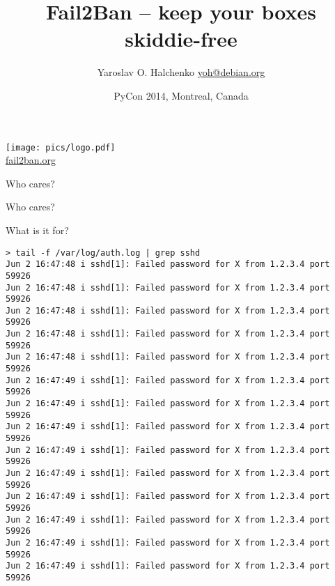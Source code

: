 \documentclass[]{beamer}
\title[Fail2Ban]{Fail2Ban -- keep your boxes skiddie-free}
\author[yoh AKA Yarik]{Yaroslav O. Halchenko
  \href{mailto: yoh@debian.org}{yoh@debian.org}}
\institute[Dartmouth, (Neuro)Debian]{\href{http://www.dartmouth.edu}{Dartmouth College},
\href{http://www.debian.org}{Debian Project}
}
\date[PyCon 2014]{PyCon 2014, Montreal, Canada}
\begin{document}
{%
 \NDPYMVPABG
 \frame{\titlepage}}

\begin{frame}{}
\begin{center}
\texttt{[image: pics/logo.pdf]}
\\
\href{http://fail2ban.org}{fail2ban.org}
\end{center}
\end{frame}

\begin{frame}{}
\begin{center}
\Large Who cares?
\end{center}
\end{frame}

\begin{frame}{Who cares?}
\begin{center}
\end{center}
\end{frame}



\begin{frame}[t,fragile]{What is it for?}
\begin{Verbatim}[commandchars=\\\{\},fontsize=\scriptsize]
> tail -f /var/log/auth.log | grep sshd
Jun 2 16:47:48 i sshd[1]: Failed password for X from 1.2.3.4 port 59926
Jun 2 16:47:48 i sshd[1]: Failed password for X from 1.2.3.4 port 59926
Jun 2 16:47:48 i sshd[1]: Failed password for X from 1.2.3.4 port 59926
Jun 2 16:47:48 i sshd[1]: Failed password for X from 1.2.3.4 port 59926
Jun 2 16:47:48 i sshd[1]: Failed password for X from 1.2.3.4 port 59926
Jun 2 16:47:49 i sshd[1]: Failed password for X from 1.2.3.4 port 59926
Jun 2 16:47:49 i sshd[1]: Failed password for X from 1.2.3.4 port 59926
Jun 2 16:47:49 i sshd[1]: Failed password for X from 1.2.3.4 port 59926
Jun 2 16:47:49 i sshd[1]: Failed password for X from 1.2.3.4 port 59926
Jun 2 16:47:49 i sshd[1]: Failed password for X from 1.2.3.4 port 59926
Jun 2 16:47:49 i sshd[1]: Failed password for X from 1.2.3.4 port 59926
Jun 2 16:47:49 i sshd[1]: Failed password for X from 1.2.3.4 port 59926
Jun 2 16:47:49 i sshd[1]: Failed password for X from 1.2.3.4 port 59926
Jun 2 16:47:49 i sshd[1]: Failed password for X from 1.2.3.4 port 59926
\end{Verbatim}

\end{frame}
\end{document}
